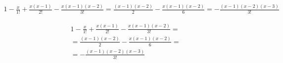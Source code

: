 \documentclass{article}
\begin{document}
\begin{align*}
  1-\frac{x}{1 !}+\frac{x(x-1)}{2 !}-\frac{x(x-1)(x-2)}{3 !}=\frac{(x-1)(x-2)}{2}-\frac{x(x-1)(x-2)}{6}=-\frac{(x-1)(x-2)(x-3)}{3 !}
\end{align*}

\begin{multline*}
  1-\frac{x}{1 !}+\frac{x(x-1)}{2 !}-\frac{x(x-1)(x-2)}{3 !}=\\
  =\frac{(x-1)(x-2)}{2}-\frac{x(x-1)(x-2)}{6}=\\
  =-\frac{(x-1)(x-2)(x-3)}{3 !}
\end{multline*}
\end{document}
